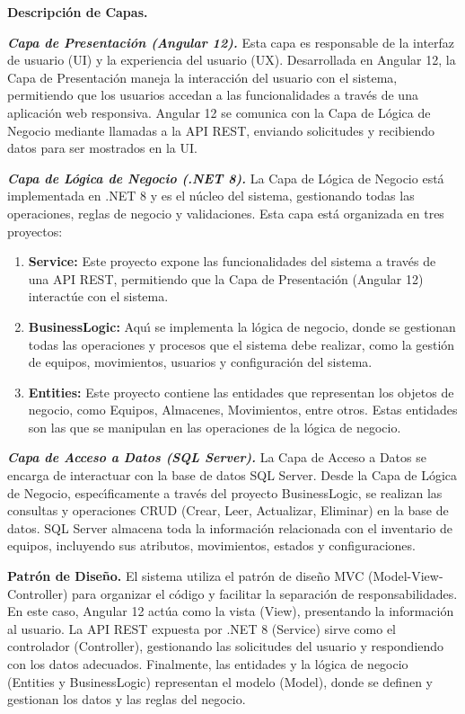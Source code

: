 \documentclass[stu, 12pt, letterpaper, donotrepeattitle, floatsintext, natbib]{apa7}
\begin{document}
\textbf{Descripci\'on de Capas. }

\textit{\textbf{Capa de Presentaci\'on (Angular 12). }}Esta capa es responsable de la interfaz de usuario (UI) y la experiencia del usuario (UX). Desarrollada en Angular 12, la Capa de Presentaci\'on maneja la interacci\'on del usuario con el sistema, permitiendo que los usuarios accedan a las funcionalidades a trav\'es de una aplicaci\'on web responsiva. Angular 12 se comunica con la Capa de L\'ogica de Negocio mediante llamadas a la API REST, enviando solicitudes y recibiendo datos para ser mostrados en la UI.

\textit{\textbf{Capa de L\'ogica de Negocio (.NET 8). }}La Capa de L\'ogica de Negocio est\'a implementada en .NET 8 y es el n\'ucleo del sistema, gestionando todas las operaciones, reglas de negocio y validaciones. Esta capa est\'a organizada en tres proyectos:
\begin{enumerate}
    \item\textbf{Service: } Este proyecto expone las funcionalidades del sistema a trav\'es de una API REST, permitiendo que la Capa de Presentaci\'on (Angular 12) interact\'ue con el sistema.
    \item\textbf{BusinessLogic: }Aqu\'{\i} se implementa la l\'ogica de negocio, donde se gestionan todas las operaciones y procesos que el sistema debe realizar, como la gesti\'on de equipos, movimientos, usuarios y configuraci\'on del sistema.
    \item\textbf{Entities: }Este proyecto contiene las entidades que representan los objetos de negocio, como Equipos, Almacenes, Movimientos, entre otros. Estas entidades son las que se manipulan en las operaciones de la l\'ogica de negocio.
\end{enumerate}

\textit{\textbf{Capa de Acceso a Datos (SQL Server). }}La Capa de Acceso a Datos se encarga de interactuar con la base de datos SQL Server. Desde la Capa de L\'ogica de Negocio, espec\'{\i}ficamente a trav\'es del proyecto BusinessLogic, se realizan las consultas y operaciones CRUD (Crear, Leer, Actualizar, Eliminar) en la base de datos. SQL Server almacena toda la informaci\'on relacionada con el inventario de equipos, incluyendo sus atributos, movimientos, estados y configuraciones.

\textbf{Patr\'on de Dise\~{n}o. }El sistema utiliza el patr\'on de dise\~{n}o MVC (Model-View-Controller) para organizar el c\'odigo y facilitar la separaci\'on de responsabilidades. En este caso, Angular 12 act\'ua como la vista (View), presentando la informaci\'on al usuario. La API REST expuesta por .NET 8 (Service) sirve como el controlador (Controller), gestionando las solicitudes del usuario y respondiendo con los datos adecuados. Finalmente, las entidades y la l\'ogica de negocio (Entities y BusinessLogic) representan el modelo (Model), donde se definen y gestionan los datos y las reglas del negocio.
\end{document}
